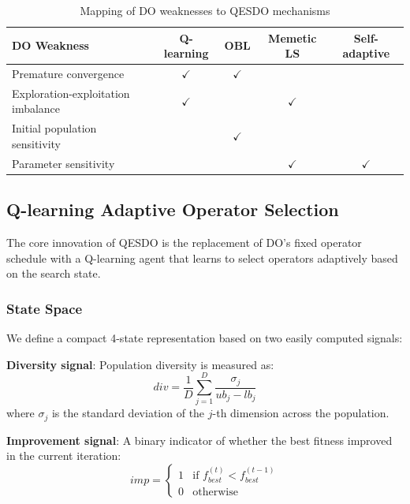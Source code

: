 \documentclass[preprint,12pt]{elsarticle}
\begin{document}
\begin{table}[htbp]
\centering
\caption{Mapping of DO weaknesses to QESDO mechanisms}
\label{tab:weakness_mapping}
\begin{tabular}{lcccc}
\toprule
\textbf{DO Weakness} & \textbf{Q-learning} & \textbf{OBL} & \textbf{Memetic LS} & \textbf{Self-adaptive} \\
\midrule
Premature convergence & $\checkmark$ & $\checkmark$ & & \\
Exploration-exploitation imbalance & $\checkmark$ & & $\checkmark$ & \\
Initial population sensitivity & & $\checkmark$ & & \\
Parameter sensitivity & & & $\checkmark$ & $\checkmark$ \\
\bottomrule
\end{tabular}
\end{table}

\subsection{Q-learning Adaptive Operator Selection}
\label{subsec:qlearning_component}

The core innovation of QESDO is the replacement of DO's fixed operator schedule with a Q-learning agent that learns to select operators adaptively based on the search state.

\subsubsection{State Space}
We define a compact 4-state representation based on two easily computed signals:

\textbf{Diversity signal}: Population diversity is measured as:
\begin{equation}
div = \frac{1}{D} \sum_{j=1}^{D} \frac{\sigma_j}{ub_j - lb_j}
\label{eq:diversity}
\end{equation}
where $\sigma_j$ is the standard deviation of the $j$-th dimension across the population.

\textbf{Improvement signal}: A binary indicator of whether the best fitness improved in the current iteration:
\begin{equation}
imp = \begin{cases} 1 & \text{if } f_{best}^{(t)} < f_{best}^{(t-1)} \\ 0 & \text{otherwise} \end{cases}
\label{eq:improvement}
\end{equation}
\end{document}
